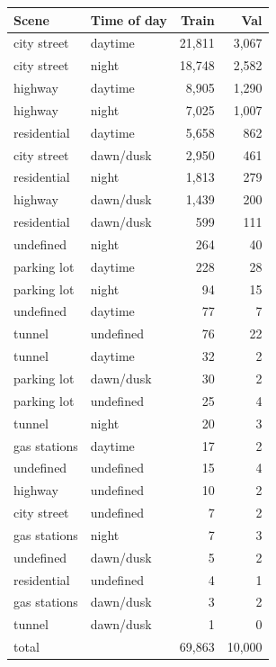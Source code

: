 \begin{tabular}{llrr}
\toprule
Scene & Time of day & Train & Val \\
\midrule
city street & daytime & 21,811 & 3,067 \\
city street & night & 18,748 & 2,582 \\
highway & daytime & 8,905 & 1,290 \\
highway & night & 7,025 & 1,007 \\
residential & daytime & 5,658 & 862 \\
city street & dawn/dusk & 2,950 & 461 \\
residential & night & 1,813 & 279 \\
highway & dawn/dusk & 1,439 & 200 \\
residential & dawn/dusk & 599 & 111 \\
undefined & night & 264 & 40 \\
parking lot & daytime & 228 & 28 \\
parking lot & night & 94 & 15 \\
undefined & daytime & 77 & 7 \\
tunnel & undefined & 76 & 22 \\
tunnel & daytime & 32 & 2 \\
parking lot & dawn/dusk & 30 & 2 \\
parking lot & undefined & 25 & 4 \\
tunnel & night & 20 & 3 \\
gas stations & daytime & 17 & 2 \\
undefined & undefined & 15 & 4 \\
highway & undefined & 10 & 2 \\
city street & undefined & 7 & 2 \\
gas stations & night & 7 & 3 \\
undefined & dawn/dusk & 5 & 2 \\
residential & undefined & 4 & 1 \\
gas stations & dawn/dusk & 3 & 2 \\
tunnel & dawn/dusk & 1 & 0 \\
total &  & 69,863 & 10,000 \\
\bottomrule
\end{tabular}
